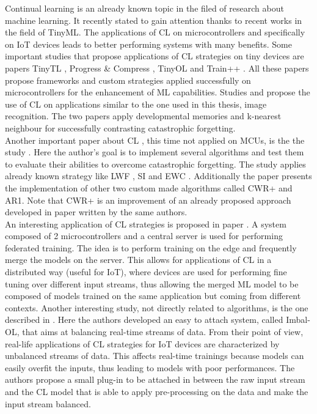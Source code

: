 \documentclass[12pt]{report}
\begin{document}
Continual learning is an already known topic in the filed of research about machine learning. It recently stated to gain attention thanks to recent works in the field of TinyML. The applications of CL on microcontrollers and specifically on IoT devices leads to better performing systems with many benefits. Some important studies that propose applications of CL strategies on tiny devices are papers TinyTL \cite{cai2020tinytl}, Progress \& Compress \cite{schwarz2018progress}, TinyOL \cite{ren2021tinyol} and Train++ \cite{sudharsan2021train++}. All these papers propose frameworks and custom strategies applied successfully on microcontrollers for the enhancement of ML capabilities. 
Studies \cite{park2020convolutional} and \cite{disabato2020incremental} propose the use of CL on applications similar to the one used in this thesis, image recognition. The two papers apply developmental memories and k-nearest neighbour for successfully contrasting catastrophic forgetting. \\
Another important paper about CL , this time not applied on MCUs, is the the study \cite{maltoni2019continuous}. Here the author's goal is to implement several algorithms and test them to evaluate their abilities to overcome catastrophic forgetting. The study applies already known strategy like LWF \cite{li2017learning}, SI \cite{zenke2017continual} and EWC \cite{kirkpatrick2017overcoming}. Additionally the paper presents the implementation of other two custom made algorithms called CWR+ and AR1. Note that CWR+ is an improvement of an already proposed approach developed in paper \cite{lomonaco2017core50} written by the same authors. \\
An interesting application of CL strategies is proposed in paper \cite{grau2021device}. A system composed of 2 microcontrollers and a central server is used for performing federated training. The idea is to perform training on the edge and frequently merge the models on the server. This allows for applications of CL in a distributed way (useful for IoT), where devices are used for performing fine tuning over different input streams, thus allowing the merged ML model to be composed of models trained on the same application but coming from different contexts.
Another interesting study, not directly related to algorithms, is the one described in \cite{sudharsan2021imbal}. Here the authors developed an easy to attach system, called Imbal-OL, that aims at balancing real-time streams of data. From their point of view, real-life applications of CL strategies for IoT devices are characterized by unbalanced streams of data. This affects real-time trainings because models can easily overfit the inputs, thus leading to models with poor performances. The authors propose a small plug-in to be attached in between the raw input stream and the CL model that is able to apply pre-processing on the data and make the input stream balanced. \\
\end{document}
